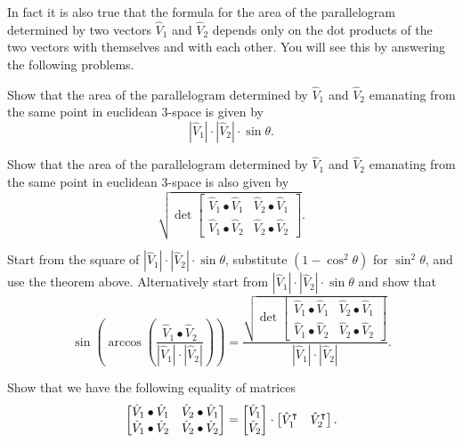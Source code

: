 \documentclass{ximera}
\begin{document}
In fact it is also true that the formula for the area of the parallelogram
determined by two vectors $\hat{V}_{1}$ and $\hat{V}_{2}$ depends only on the
dot products of the two vectors with themselves and with each other. You will
see this by answering the following problems.

\begin{problem}
Show that the area of the parallelogram determined by $\hat{V}_{1}$ and
$\hat{V}_{2}$ emanating from the same point in euclidean $3$-space is given by%
\[
|\hat{V}_{1}|\cdot|\hat{V}_{2}|\cdot\sin\theta.
\]
\end{problem}

\begin{problem}
\label{9}Show that the area of the parallelogram determined by $\hat{V}_{1}$
and $\hat{V}_{2}$ emanating from the same point in euclidean $3$-space is also
given by%
\[
\sqrt{\det
\begin{bmatrix}
\hat{V}_{1}\bullet\hat{V}_{1} & \hat{V}_{2}\bullet\hat{V}_{1}\\
\hat{V}_{1}\bullet\hat{V}_{2} & \hat{V}_{2}\bullet\hat{V}_{2}%
\end{bmatrix}}.
\]

\begin{hint}
Start from the square of
$|\hat{V}_{1}|\cdot|\hat{V}_{2}|\cdot\sin\theta$, substitute $\left(
1-\cos^{2}\theta\right)$ for $\sin^{2}\theta$, and use the theorem
above. Alternatively start from
$|\hat{V}_{1}|\cdot|\hat{V}_{2}|\cdot\sin\theta$ and show that%
\[
\sin\left(  \arccos\left(  \frac{\hat{V}_{1}\bullet\hat{V}%
_{2}}{\left\vert \hat{V}_{1}\right\vert \cdot\left\vert \hat{V}_{2}\right\vert
}\right)  \right)  
=\frac{\sqrt{\det
    \begin{bmatrix}
      \hat{V}_{1}\bullet\hat{V}_{1} & \hat{V}_{2}\bullet\hat{V}_{1}\\
      \hat{V}_{1}\bullet\hat{V}_{2} & \hat{V}_{2}\bullet\hat{V}_{2}
    \end{bmatrix}
  }
}{\left\vert\hat{V}_{1}\right\vert \cdot\left\vert
  \hat{V}_{2}\right\vert }.
\]
\end{hint}

\end{problem}

\begin{problem}
Show that we have the following equality of matrices%
\[
\begin{bmatrix}
\hat{V}_{1}\bullet\hat{V}_{1} & \hat{V}_{2}\bullet\hat{V}_{1}\\
\hat{V}_{1}\bullet\hat{V}_{2} & \hat{V}_{2}\bullet\hat{V}_{2}%
\end{bmatrix}
=
\begin{bmatrix}
\hat{V}_{1} \\
\hat{V}_{2}
\end{bmatrix}
\cdot
\begin{bmatrix}
\hat{V}_{1}^\transpose  & \hat{V}_{2}^\transpose 
\end{bmatrix}.
\]

\end{problem}
\end{document}
